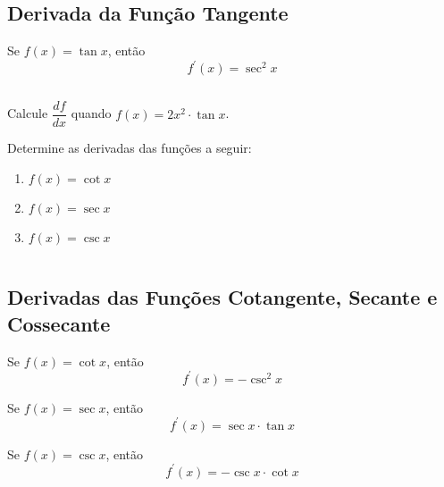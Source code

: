 \subsection{Derivada da Função Tangente}
\begin{frame}
  \begin{theorem}
    Se $f(x)=\tan{x}$, então
    \begin{equation*}
      f^{\prime}(x) = \sec^{2}{x}
    \end{equation*}
  \end{theorem}
  \begin{columns}[onlytextwidth]
    \begin{column}{0.5\textwidth}
      \begin{example-highlight}
        Calcule $\dfrac{df}{dx}$ quando $f(x)=2x^{2}\cdot\tan{x}$.
      \end{example-highlight}

      \begin{example-highlight}
        Determine as derivadas das funções a seguir:
        \begin{enumerate}
          \item $f(x) = \cot{x}$
          \item $f(x) = \sec{x}$
          \item $f(x) = \csc{x}$
        \end{enumerate}
      \end{example-highlight}
    \end{column}
    \begin{column}{0.5\textwidth}
    \end{column}
  \end{columns}
\end{frame}

\subsection{Derivadas das Funções Cotangente, Secante e Cossecante}
\begin{frame}
  \begin{theorem}
    Se $f(x)=\cot{x}$, então
    \begin{equation*}
      f^{\prime}(x) = -\csc^{2}{x}
    \end{equation*}
  \end{theorem}
  \vfill
  \begin{theorem}
    Se $f(x)=\sec{x}$, então
    \begin{equation*}
      f^{\prime}(x) = \sec{x}\cdot\tan{x}
    \end{equation*}
  \end{theorem}
  \vfill
  \begin{theorem}
    Se $f(x)=\csc{x}$, então
    \begin{equation*}
      f^{\prime}(x) = -\csc{x}\cdot\cot{x}
    \end{equation*}
  \end{theorem}
\end{frame}

